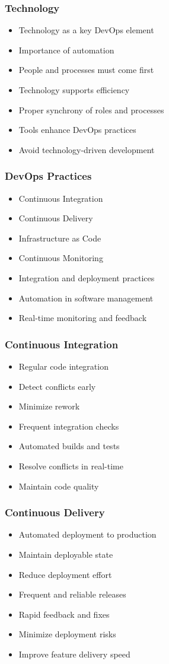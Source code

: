 \documentclass[aspectratio=169, table]{beamer}
\begin{document}
\begin{frame}
	\frametitle{Technology}
	\begin{itemize}
		\item Technology as a key DevOps element
		\item Importance of automation
		\item People and processes must come first
		\item Technology supports efficiency
		\item Proper synchrony of roles and processes
		\item Tools enhance DevOps practices
		\item Avoid technology-driven development
	\end{itemize}
\end{frame}

\begin{frame}
	\frametitle{DevOps Practices}
	\begin{itemize}
		\item Continuous Integration
		\item Continuous Delivery
		\item Infrastructure as Code
		\item Continuous Monitoring
		\item Integration and deployment practices
		\item Automation in software management
		\item Real-time monitoring and feedback
	\end{itemize}
\end{frame}

\begin{frame}
	\frametitle{Continuous Integration}
	\begin{itemize}
		\item Regular code integration
		\item Detect conflicts early
		\item Minimize rework
		\item Frequent integration checks
		\item Automated builds and tests
		\item Resolve conflicts in real-time
		\item Maintain code quality
	\end{itemize}
\end{frame}

\begin{frame}
	\frametitle{Continuous Delivery}
	\begin{itemize}
		\item Automated deployment to production
		\item Maintain deployable state
		\item Reduce deployment effort
		\item Frequent and reliable releases
		\item Rapid feedback and fixes
		\item Minimize deployment risks
		\item Improve feature delivery speed
	\end{itemize}
\end{frame}
\end{document}

